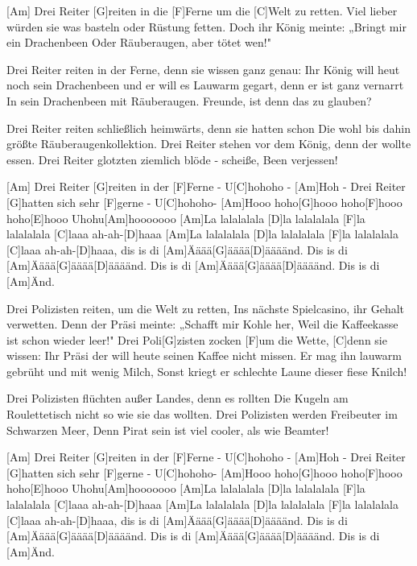 

\begin{guitar}
	[Am] Drei Reiter [G]reiten in die [F]Ferne um die [C]Welt zu retten.
	Viel lieber würden sie was basteln oder Rüstung fetten.
	Doch ihr König meinte: „Bringt mir ein Drachenbeen
	Oder Räuberaugen, aber tötet wen!"
	
	Drei Reiter reiten in der Ferne, denn sie wissen ganz genau:
	Ihr König will heut noch sein Drachenbeen und er will es 
	Lauwarm gegart, denn er ist ganz vernarrt
	In sein Drachenbeen mit Räuberaugen. Freunde, ist denn das zu glauben?
	
	Drei Reiter reiten schließlich heimwärts, denn sie hatten schon
	Die wohl bis dahin größte Räuberaugenkollektion.
	Drei Reiter stehen vor dem König, denn der wollte essen.
	Drei Reiter glotzten ziemlich blöde - scheiße, Been verjessen!
	
	\begin{highlightbar}
		[Am] Drei Reiter [G]reiten in der [F]Ferne - U[C]hohoho -
		[Am]Hoh - Drei Reiter [G]hatten sich sehr [F]gerne - U[C]hohoho-
		[Am]Hooo hoho[G]hooo hoho[F]hooo hoho[E]hooo
		Uhohu[Am]hooooooo
		[Am]La lalalalala [D]la lalalalala [F]la lalalalala [C]laaa ah-ah-[D]haaa
		[Am]La lalalalala [D]la lalalalala [F]la lalalalala [C]laaa ah-ah-[D]haaa, dis is di 
		[Am]{Ä}äää[G]{ä}äää[D]{ä}ääänd. Dis is di 
		[Am]{Ä}äää[G]{ä}äää[D]{ä}ääänd. Dis is di 
		[Am]{Ä}äää[G]{ä}äää[D]{ä}ääänd. Dis is di 
		[Am]{Ä}nd.
	\end{highlightbar}
	
	\songsection{Strophe 2}
	Drei Polizisten reiten, um die Welt zu retten,
	Ins nächste Spielcasino, ihr Gehalt verwetten.
	Denn der Präsi meinte: „Schafft mir Kohle her,
	Weil die Kaffeekasse ist schon wieder leer!"
	\pagebreak
	[Am] Drei Poli[G]zisten zocken [F]um die Wette, [C]denn sie wissen:
	Ihr Präsi der will heute seinen Kaffee nicht missen.
	Er mag ihn lauwarm gebrüht und mit wenig Milch,
	Sonst kriegt er schlechte Laune dieser fiese Knilch!
	
	Drei Polizisten flüchten außer Landes, denn es rollten
	Die Kugeln am Roulettetisch nicht so wie sie das wollten.
	Drei Polizisten werden Freibeuter im Schwarzen Meer,
	Denn Pirat sein ist viel cooler, als wie Beamter!
	
	\begin{highlightbar}
		\songsection{Refrain}
		[Am] Drei Reiter [G]reiten in der [F]Ferne - U[C]hohoho -
		[Am]Hoh - Drei Reiter [G]hatten sich sehr [F]gerne - U[C]hohoho-
		[Am]Hooo hoho[G]hooo hoho[F]hooo hoho[E]hooo
		Uhohu[Am]hooooooo
		[Am]La lalalalala [D]la lalalalala [F]la lalalalala [C]laaa ah-ah-[D]haaa
		[Am]La lalalalala [D]la lalalalala [F]la lalalalala [C]laaa ah-ah-[D]haaa, dis is di 
		[Am]{Ä}äää[G]{ä}äää[D]{ä}ääänd. Dis is di 
		[Am]{Ä}äää[G]{ä}äää[D]{ä}ääänd. Dis is di 
		[Am]{Ä}äää[G]{ä}äää[D]{ä}ääänd. Dis is di 
		[Am]{Ä}nd.
	\end{highlightbar}
\end{guitar}
